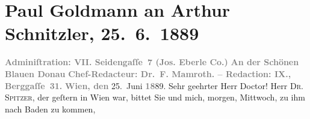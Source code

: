 

         
         \renewcommand{\erwaehntePersonen}{Personen: Fedor Mamroth, Alfred Spitzer}
         \renewcommand{\erwaehnteInstitutionen}{Institutionen: An der schönen blauen Donau, Josef Eberle Stein-, Buch und Musikaliendruckerei}
         \renewcommand{\erwaehnteOrte}{Orte: Baden bei Wien, Berggasse, Seidengasse, Wien}
         \renewcommand{\erwaehnteWerke}{}
               \section[Paul Goldmann an Arthur Schnitzler, 25. 6. 1889]{ Paul Goldmann an Arthur Schnitzler, 25. 6. 1889}\nopagebreak{}\rehead{ }\begin{ledgroupsized}[t]{13cm}\normalsize\beginnumbering \toendnotes[C]{\smallbreak\pagebreak[2]} 
\toendnotes[C]{\smallbreak}\pstart
           \noindent{}\centering{}{\pb}\textcolor{gray}{\textbf{\textbf{Adminiſtration: VII.
                           Seidengaſſe 7} (Jos. Eberle {\kaufmannsund} Co.)}}\pend
           \pstart
           \noindent{}\centering{}\textcolor{gray}{\textbf{An der Schönen Blauen Donau}}\pend
           \pstart
           \noindent{}\centering{}\textcolor{gray}{\textbf{Chef-Redacteur: Dr. F.
                        Mamroth. – Redaction: IX.,
                        Berggaſſe 31.}}\pend
           \pstart
           \raggedleft{}\textcolor{gray}{\textbf{Wien, den}}{ }25. Juni \textcolor{gray}{\textbf{18}}89.\pend
           \pstart\center{}Sehr geehrter Herr Doctor!\pend\pstart
           Herr \textsc{Dr. Spitzer}, der geſtern in Wien war, bittet Sie und mich, morgen,
                  Mittwoch, zu ihm nach Baden zu kommen,

\end{ledgroupsized}
